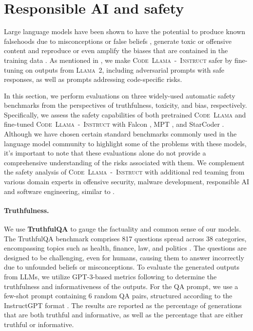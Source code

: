 \documentclass[10pt]{article}
\newcommand{\model}{\textsc{Code~Llama}\xspace}
\newcommand{\instmodel}{\textsc{Code~Llama~-~Instruct}\xspace}
\newcommand{\llamavtwo}{\textsc{Llama~2}\xspace}
\begin{document}
\section{Responsible AI and safety}\label{sec:safety}


Large language models have been shown to have the potential to produce known falsehoods due to misconceptions or false beliefs \citep{lin2021truthfulqa}, generate toxic or offensive content \citep{hartvigsen2022toxigen} and reproduce or even amplify the biases that are contained in the training data \citep{dhamala2021bold}.
As mentioned in , we make \instmodel safer by fine-tuning on outputs from \llamavtwo, including adversarial prompts with safe responses, as well as prompts addressing code-specific risks.


In this section, we perform evaluations on three widely-used automatic safety benchmarks from the perspectives of truthfulness, toxicity, and bias, respectively. 
Specifically, we assess the safety capabilities of both pretrained \model and fine-tuned \instmodel with Falcon \citep{falcon40b}, MPT \citep{themosaicmlnlpteam2023introducing}, and StarCoder \citep{li2023starcoder}. 
Although we have chosen certain standard benchmarks commonly used in the language model community to highlight some of the problems with these models, it's important to note that these evaluations alone do not provide a comprehensive understanding of the risks associated with them. 
We complement the safety analysis of \instmodel with additional red teaming from various domain experts in offensive security, malware development, responsible AI and software engineering, similar to \cite{touvron2023llamav2}.


\paragraph{Truthfulness.} We use \textbf{TruthfulQA} \citep{lin2021truthfulqa} to gauge the factuality and common sense of our models. 
The TruthfulQA benchmark comprises 817 questions spread across 38 categories, encompassing topics such as health, finance, law, and politics \citep{lin2021truthfulqa}. 
The questions are designed to be challenging, even for humans, causing them to answer incorrectly due to unfounded beliefs or misconceptions. To evaluate the generated outputs from LLMs, we utilize GPT-3-based metrics following \cite{lin2021truthfulqa} to determine the truthfulness and informativeness of the outputs. For the QA prompt, we use a few-shot prompt containing 6 random QA pairs, structured according to the InstructGPT format \citep{ouyang2022training}. The results are reported as the percentage of generations that are both truthful and informative, as well as the percentage that are either truthful or informative.
\end{document}
